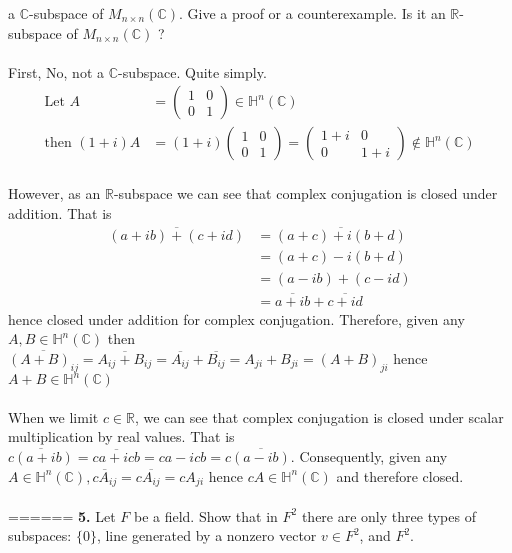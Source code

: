 \documentclass[11pt]{amsart}
\theoremstyle{definition}  %
\newcommand{\R}{\mathbb{R}}
\newcommand{\C}{\mathbb{C}}
\begin{document}
a $\C$-subspace of $M_{n \times n}(\C)$. Give a proof or a counterexample. Is it an $\R$-subspace of $M_{n \times n}(\C)$ ? \\
\\
First, No, not a $\C$-subspace.  Quite simply.
\begin{align*}
	\text{Let } A &= \left ( \begin{array}{cc}
		1 & 0 \\
		0 & 1
\end{array}	 \right ) \in \mathbb{H}^n(\C) \\
	\text{then } (1+i)A &= (1+i)\left ( \begin{array}{cc}
		1 & 0 \\
		0 & 1
\end{array}	 \right ) = \left ( \begin{array}{cc}
		1+i & 0 \\
		0 & 1+i
\end{array}	 \right ) \not \in \mathbb{H}^n(\C)
\end{align*}
\\
However, as an $\R$-subspace we can see that complex conjugation is closed under addition.  That is 
\begin{align*}
	\overline{(a+ib)+(c+id)} &= \overline{(a+c)+i(b+d)} \\
	&= (a+c)-i(b+d) \\
	&= (a-ib)+(c-id) \\
	&= \overline{a+ib}+\overline{c+id}
\end{align*} hence closed under addition for complex conjugation.  Therefore, given any $A,B \in \mathbb{H}^n(\C)$ then $\overline{(A+B)_{ij}}= \overline{A_{ij}+B_{ij}} = \overline{A_{ij}}+\overline{B_{ij}} = A_{ji}+B_{ji} = (A+B)_{ji}$ hence $A+B \in \mathbb{H}^n(\C)$
\\ \\
When we limit $c \in \R$, we can see that complex conjugation is closed under scalar multiplication by real values.  That is $\overline{c(a+ib)} = \overline{ca+icb} = ca-icb = c\overline{(a-ib)}$.  Consequently, given any $A \in \mathbb{H}^n(\C), \overline{cA_{ij}}= c\overline{A_{ij}}=cA_{ji}$ hence $cA \in \mathbb{H}^n(\C)$ and therefore closed.\\
\\
======
\vskip 0.1cm
\noindent
{\bf 5.} Let $F$ be a field. Show that in $F^2$ there are only three types of subspaces: $\{0\}$, line generated by a nonzero vector $v \in F^2$, and $F^2$. \\
\\
\end{document}
